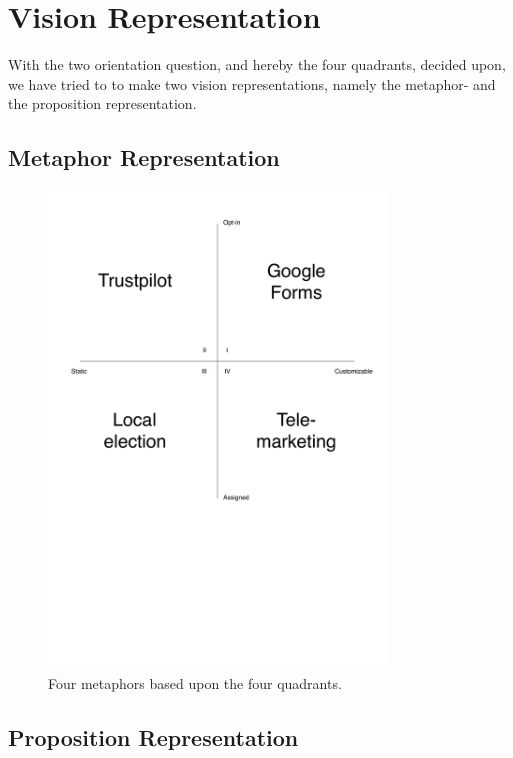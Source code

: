 
\section{Vision Representation}
\label{sec:vision_representation}

With the two orientation question, and hereby the four quadrants, decided upon, we have tried to to make two vision representations, namely the metaphor- and the proposition representation.

\subsection{Metaphor Representation}
\label{sub:metaphor_representation}

\begin{figure}[!htbp]
	\centering
	\includegraphics[width=0.8\textwidth]{graphic/problem_analysis/vision/metaphor.pdf}
	\caption{Four metaphors based upon the four quadrants.}
	\label{fig:metaphor}
\end{figure}
\FloatBarrier

\subsection{Proposition Representation}

